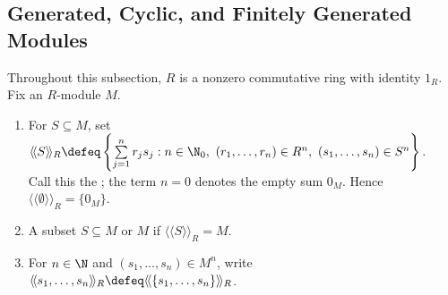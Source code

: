 \subsection{Generated, Cyclic, and Finitely Generated Modules}

Throughout this subsection, $R$ is a nonzero commutative ring with identity $1_R$. Fix an $R$-module $M$.

\begin{definition} \label{def:generated-submodule} 
\begin{enumerate}[label=(\roman*)]
\setlength{\itemsep}{0pt}
\item For $S\subseteq M$, set $\langle\!\langle S\rangle\!\rangle_R\defeq\left\{\sum\limits_{j=1}^{n}r_js_j:n\in\N_0,\ (r_1,\ldots,r_n)\in R^n,\ (s_1,\ldots,s_n)\in S^n\right\}$.\\
Call this the ; the term $n=0$ denotes the empty sum $0_M$. Hence $\langle\!\langle\emptyset\rangle\!\rangle_R=\{0_M\}$.
\item A subset $S\subseteq M$  or  $M$ if $\langle\!\langle S\rangle\!\rangle_R=M$.
\item For $n\in\N$ and $(s_1,\ldots,s_n)\in M^n$, write $\langle\!\langle s_1,\ldots,s_n\rangle\!\rangle_R\defeq\langle\!\langle\{s_1,\ldots,s_n\}\rangle\!\rangle_R$.
\end{enumerate}
\end{definition}

